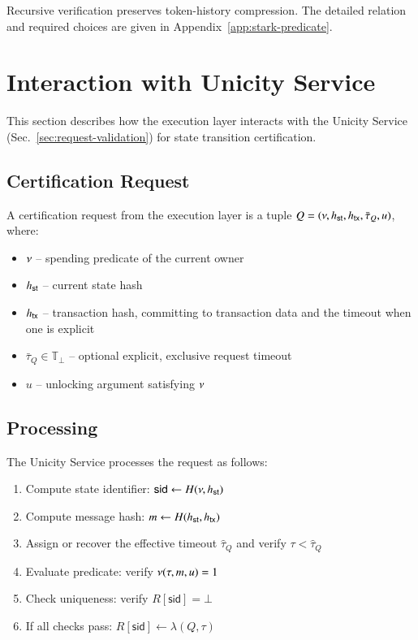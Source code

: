 Recursive verification preserves token-history compression. The detailed relation and required choices are given in Appendix~\ref{app:stark-predicate}.

\section{Interaction with Unicity Service}\label{sec:el-us-interaction}

This section describes how the execution layer interacts with the Unicity Service (Sec.~\ref{sec:request-validation}) for state transition certification.

\subsection{Certification Request}

A certification request from the execution layer is a tuple $Q = (\nu, {h_\mathsf{st}}, {h_\mathsf{tx}}, \bar\tau_Q, u)$, where:
\begin{itemize}
	\item $\nu$ -- spending predicate of the current owner
	\item ${h_\mathsf{st}}$ -- current state hash
	\item ${h_\mathsf{tx}}$ -- transaction hash, committing to transaction data and the timeout when one is explicit
	\item $\bar\tau_Q\in\mathbb{T}_\bot$ -- optional explicit, exclusive request timeout
	\item $u$ -- unlocking argument satisfying $\nu$
\end{itemize}

\subsection{Processing}\label{sec:us-processing}

The Unicity Service processes the request as follows:
\begin{enumerate}
	\item Compute state identifier: $\mathsf{sid} \gets H(\nu, {h_\mathsf{st}})$
	\item Compute message hash: $m \gets H({h_\mathsf{st}}, {h_\mathsf{tx}})$
	\item Assign or recover the effective timeout $\widehat\tau_Q$ and verify $\tau < \widehat\tau_Q$
	\item Evaluate predicate: verify $\nu(\tau, m, u) = 1$
	\item Check uniqueness: verify $R[\mathsf{sid}] = \bot$
	\item If all checks pass: $R[\mathsf{sid}] \gets \lambda(Q,\tau)$
\end{enumerate}

